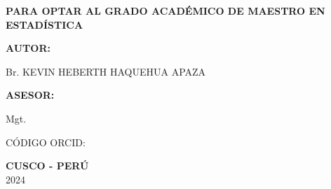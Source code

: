 \begin{center}
\fontsize{14pt}{11pt}\selectfont\bfseries{ PARA OPTAR AL GRADO ACADÉMICO DE MAESTRO EN ESTADÍSTICA} 
\end{center}


\hspace{8cm} \textbf{AUTOR:} \nolinebreak
\vspace{-0.3cm}

\hspace{8cm} Br. KEVIN HEBERTH HAQUEHUA APAZA


\hspace{8cm} \textbf{ASESOR:} \nolinebreak
\vspace{-0.3cm}

\hspace{8cm} Mgt.
\vspace{-0.3cm}

\hspace{8cm} CÓDIGO ORCID: 






\vspace{0.3cm}						

\begin{center}
\Large \textbf{CUSCO - PERÚ} \\  2024
\end{center}

\clearpage